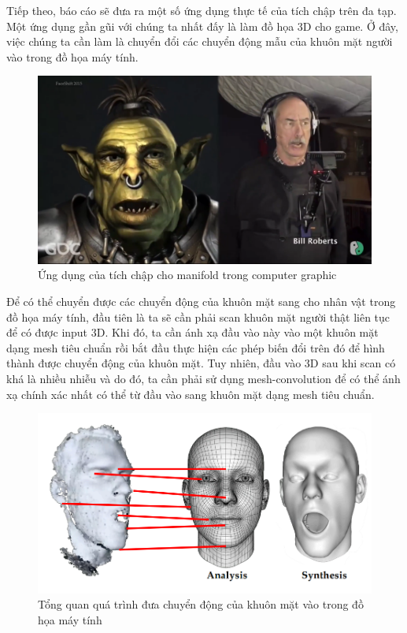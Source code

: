Tiếp theo, báo cáo sẽ đưa ra một số ứng dụng thực tế của tích chập trên đa tạp. Một ứng dụng gần gũi với chúng ta nhất đấy là làm đồ họa 3D cho game. Ở đây, việc chúng ta cần làm là chuyển đổi các chuyển động mẫu của khuôn mặt người vào trong đồ họa máy tính.

\begin{figure}[H]
    \centering
    \includegraphics[width=0.7\linewidth]{Images/GDL/manifold_mesh/mani_cnn/app_mani.png}
    \caption{Ứng dụng của tích chập cho manifold trong computer graphic\cite{geometricdeep2022}}
\end{figure}

Để có thể chuyển được các chuyển động của khuôn mặt sang cho nhân vật trong đồ họa máy tính, đầu tiên là ta sẽ cần phải scan khuôn mặt người thật liên tục để có được input 3D. Khi đó, ta cần ánh xạ đầu vào này vào một khuôn mặt dạng mesh tiêu chuẩn rồi bắt đầu thực hiện các phép biến đổi trên đó để hình thành được chuyển động của khuôn mặt. Tuy nhiên, đầu vào 3D sau khi scan có khá là nhiều nhiễu và do đó, ta cần phải sử dụng mesh-convolution để có thể ánh xạ chính xác nhất có thể từ đầu vào sang khuôn mặt dạng mesh tiêu chuẩn\cite{geometricdeep2022}.

\begin{figure}[H]
    \centering
    \includegraphics[width=0.7\linewidth]{Images/GDL/manifold_mesh/mani_cnn/computer_graphic.png}
    \caption{Tổng quan quá trình đưa chuyển động của khuôn mặt vào trong đồ họa máy tính\cite{geometricdeep2022}}
\end{figure}

